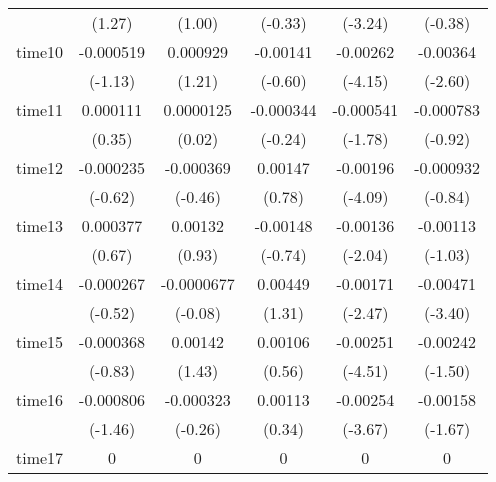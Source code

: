 \begin{table}[htbp]
\begin{tabular}{l*{5}{c}}
            &      (1.27)         &      (1.00)         &     (-0.33)         &     (-3.24)         &     (-0.38)         \\
time10      &   -0.000519         &    0.000929         &    -0.00141         &    -0.00262\sym{***}&    -0.00364\sym{**} \\
            &     (-1.13)         &      (1.21)         &     (-0.60)         &     (-4.15)         &     (-2.60)         \\
time11      &    0.000111         &   0.0000125         &   -0.000344         &   -0.000541         &   -0.000783         \\
            &      (0.35)         &      (0.02)         &     (-0.24)         &     (-1.78)         &     (-0.92)         \\
time12      &   -0.000235         &   -0.000369         &     0.00147         &    -0.00196\sym{***}&   -0.000932         \\
            &     (-0.62)         &     (-0.46)         &      (0.78)         &     (-4.09)         &     (-0.84)         \\
time13      &    0.000377         &     0.00132         &    -0.00148         &    -0.00136\sym{*}  &    -0.00113         \\
            &      (0.67)         &      (0.93)         &     (-0.74)         &     (-2.04)         &     (-1.03)         \\
time14      &   -0.000267         &  -0.0000677         &     0.00449         &    -0.00171\sym{*}  &    -0.00471\sym{***}\\
            &     (-0.52)         &     (-0.08)         &      (1.31)         &     (-2.47)         &     (-3.40)         \\
time15      &   -0.000368         &     0.00142         &     0.00106         &    -0.00251\sym{***}&    -0.00242         \\
            &     (-0.83)         &      (1.43)         &      (0.56)         &     (-4.51)         &     (-1.50)         \\
time16      &   -0.000806         &   -0.000323         &     0.00113         &    -0.00254\sym{***}&    -0.00158         \\
            &     (-1.46)         &     (-0.26)         &      (0.34)         &     (-3.67)         &     (-1.67)         \\
time17      &           0         &           0         &           0         &           0         &           0         \\

\end{tabular}
\end{table}
